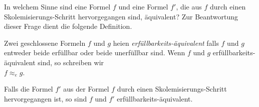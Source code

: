 In welchem Sinne sind eine Formel $f$ und eine Formel $f'$, die aus $f$ durch einen 
Skolem\-isierungs-Schritt hervorgegangen sind, \"{a}quivalent?  Zur Beantwortung dieser Frage
dient die folgende Definition. 

\begin{Definition}
   Zwei geschlossene Formeln $f$ und $g$ hei\3en 
   \emph{erf\"{u}llbarkeits-\"{a}quivalent}
   falls $f$ und $g$ entweder beide erf\"{u}llbar oder beide unerf\"{u}llbar sind.
   Wenn $f$ und $g$ erf\"{u}llbarkeits-\"{a}quivalent sind, so schreiben wir \\[0.2cm]
   \hspace*{1.3cm} $f \approx_e g$.
\eox
\end{Definition}


\noindent
\begin{Satz}
  Falls die Formel $f'$ aus der Formel $f$ durch einen Skolemisierungs-Schritt 
  hervorgegangen ist, so sind $f$ und $f'$ erf\"{u}llbarkeits-\"{a}quivalent.
\end{Satz}


